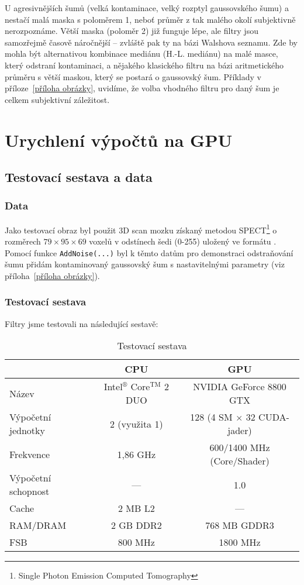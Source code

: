      U agresivnějších šumů (velká kontaminace, velký rozptyl gaussovského šumu) a nestačí malá maska s poloměrem 1, neboť průměr z tak malého okolí subjektivně nerozpoznáme. Větší maska (poloměr 2) již funguje lépe, ale filtry jsou samozřejmě časově náročnější -- zvláště pak ty na bázi Walshova seznamu. Zde by mohla být alternativou kombinace mediánu (H.-L. mediánu) na malé masce, který odstraní kontaminaci, a nějakého klasického filtru na bázi aritmetického průměru s větší maskou, který se postará o gaussovský šum. Příklady v příloze~\ref{příloha obrázky}, uvidíme, že volba vhodného filtru pro daný šum je celkem subjektivní záležitost.

\section{Urychlení výpočtů na GPU}

    \subsection{Testovací sestava a data}

    \subsubsection{Data}

        Jako testovací obraz byl použit 3D scan mozku získaný metodou SPECT\footnote{Single Photon Emission Computed Tomography} o rozměrech $79 \times 95 \times 69$ voxelů v odstínech šedi (0-255) uložený ve formátu \Analyze. Pomocí funkce {\tt AddNoise(...)} byl k těmto datům pro demonstraci odstraňování šumu přidám kontaminovaný gaussovský šum s nastavitelnými parametry (viz příloha~\ref{příloha obrázky}).

    \subsubsection{Testovací sestava}

    Filtry jsme testovali na následující sestavě:

    \begin{table}[h]
    \begin{center}
    \begin{tabular}{lcc}
      \toprule
      & CPU & GPU \\
      \midrule
      Název & Intel$^\circledR$ Core$^\mathrm{TM}$ 2 DUO & NVIDIA GeForce 8800 GTX \\
      Výpočetní jednotky & 2 (využita 1) & 128 (4 SM $\times$ 32 CUDA-jader) \\
      Frekvence & 1,86 GHz & 600/1400 MHz (Core/Shader)\\
      Výpočetní schopnost & --- & 1.0 \\
      Cache & 2 MB L2 & --- \\
      RAM/DRAM & 2 GB DDR2 & 768 MB GDDR3 \\
      FSB & 800 MHz & 1800 MHz \\
      \bottomrule
    \end{tabular}
    \caption{Testovací sestava}
    \end{center}
\end{table}

